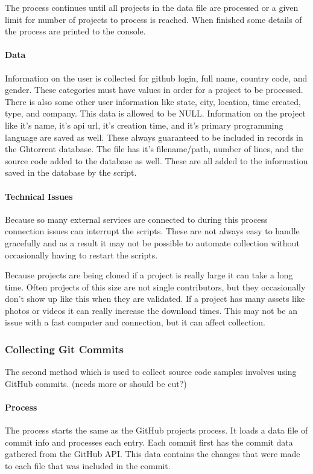 \documentclass{article}
\begin{document}
The process continues until all projects in the data file are processed or a given limit for number of projects to process is reached. When finished some details of the process are printed to the console.

\paragraph{Data}
Information on the user is collected for github login, full name, country code, and gender. These categories must have values in order for a project to be processed. There is also some other user information like state, city, location, time created, type, and company. This data is allowed to be NULL. Information on the project like it's name, it's api url, it's creation time, and it's primary programming language are saved as well. These always guaranteed to be included in records in the Ghtorrent database. The file has it's filename/path, number of lines, and the source code added to the database as well. These are all added to the information saved in the database by the script.

\paragraph{Technical Issues}
Because so many external services are connected to during this process connection issues can interrupt the scripts. These are not always easy to handle gracefully and as a result it may not be possible to automate collection without occasionally having to restart the scripts.

Because projects are being cloned if a project is really large it can take a long time. Often projects of this size are not single contributors, but they occasionally don't show up like this when they are validated. If a project has many assets like photos or videos it can really increase the download times. This may not be an issue with a fast computer and connection, but it can affect collection.


\subsubsection{Collecting Git Commits}
The second method which is used to collect source code samples involves using GitHub commits. (needs more or should be cut?)

\paragraph{Process}
The process starts the same as the GitHub projects process. It loads a data file of commit info and processes each entry. Each commit first has the commit data gathered from the GitHub API. This data contains the changes that were made to each file that was included in the commit.
\end{document}
